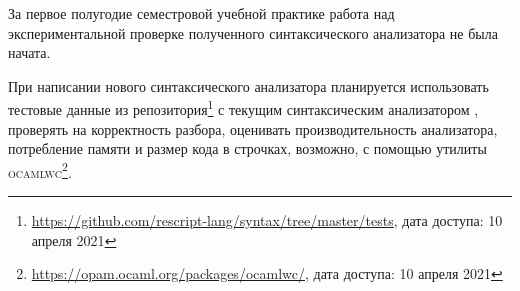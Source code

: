 За первое полугодие семестровой учебной практике работа над экспериментальной проверке полученного синтаксического анализатора не была начата. 

При написании нового синтаксического анализатора планируется использовать тестовые данные из репозитория\footnote{\url{https://github.com/rescript-lang/syntax/tree/master/tests}, дата доступа: 10 апреля 2021} с текущим синтаксическим анализатором \ReScript{}, проверять на корректность разбора, оценивать производительность анализатора, потребление памяти и размер кода в строчках, возможно, с помощью утилиты \textsc{ocamlwc}\footnote{\url{https://opam.ocaml.org/packages/ocamlwc/}, дата доступа: 10 апреля 2021}.

